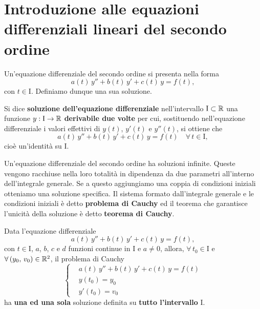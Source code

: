 \documentclass[../../analisi2]{subfiles}
\begin{document}
    \chapter{Introduzione alle equazioni differenziali lineari del secondo ordine}

        Un'equazione differenziale del secondo ordine si presenta nella forma
        \[
            a(t) \, y'' + b(t) \, y' + c(t) \, y = f(t),
        \]
        con \(t \in \mathrm{I}\). Definiamo dunque una sua soluzione.

        \begin{definizione}
            Si dice \textbf{soluzione dell'equazione differenziale} nell'intervallo \(\mathrm{I} \subset \mathbb{R}\) una funzione
            \(y : \mathrm{I} \to \mathbb{R}\) \textbf{derivabile due volte} per cui, sostituendo nell'equazione differenziale i valori effettivi
            di \(y(t)\), \(y'(t)\) e \(y''(t)\), si ottiene che
            \[
                a(t) \, y'' + b(t) \, y' + c(t) \, y = f(t) \quad \forall \, t \in \mathrm{I},
            \] cioè un'identità su \(\mathrm{I}\).
        \end{definizione}

        Un'equazione differenziale del secondo ordine ha soluzioni infinite. Queste vengono racchiuse nella loro totalità
        in dipendenza da due parametri all'interno dell'integrale generale. Se a questo aggiungiamo una coppia di condizioni iniziali
        otteniamo una soluzione specifica. Il sistema formato dall'integrale generale e le condizioni iniziali è detto
        \textbf{problema di Cauchy} ed il teorema che garantisce l'unicità della soluzione è detto \textbf{teorema di Cauchy}.

        \begin{teorema}
            Data l'equazione differenziale
            \[
                a(t) \, y'' + b(t) \, y' + c(t) \, y = f(t),
            \]
            con \(t \in \mathrm{I}\), \(a\), \(b\), \(c\) e \(d\) funzioni continue in \(\mathrm{I}\) e \(a \neq 0\), allora,
            \(\forall \, t_0 \in \mathrm{I}\) e \(\forall \, (y_0, \, v_0) \in \mathbb{R}^2\), il problema di Cauchy
            \[
                \left\{
                    \begin{aligned}
                        &a(t) \, y'' + b(t) \, y' + c(t) \, y = f(t)\\
                        &y(t_0) = y_0\\
                        &y'(t_0) = v_0
                    \end{aligned}
                \right.
            \]
            ha \textbf{una ed una sola} soluzione definita su \textbf{tutto l'intervallo} \(\mathrm{I}\).
        \end{teorema}
            
\end{document}
